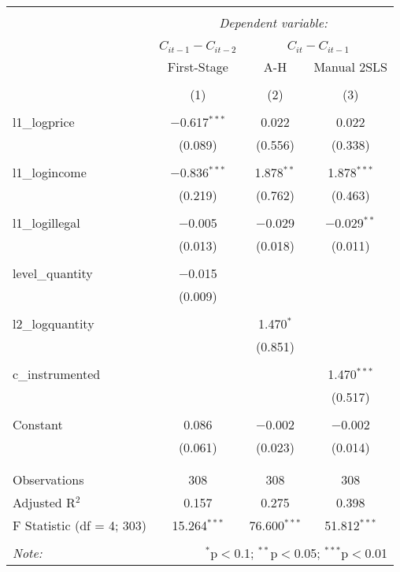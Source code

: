 \documentclass[
]{article}
\begin{document}
\begin{table}[!htbp] \centering 
  \caption{} 
  \label{tab:reg} 
\begin{tabular}{@{\extracolsep{-5pt}}lccc} 
\\[-1.8ex]\hline 
\hline \\[-1.8ex] 
 & \multicolumn{3}{c}{\textit{Dependent variable:}} \\ 
\cline{2-4} 
\\[-1.8ex] & $C_{it-1} - C_{it-2}$ & \multicolumn{2}{c}{$C_{it} - C_{it-1}$} \\ 
 & First-Stage & A-H & Manual 2SLS \\ 
\\[-1.8ex] & (1) & (2) & (3)\\ 
\hline \\[-1.8ex] 
 l1\_logprice & $-$0.617$^{***}$ & 0.022 & 0.022 \\ 
  & (0.089) & (0.556) & (0.338) \\ 
  & & & \\ 
 l1\_logincome & $-$0.836$^{***}$ & 1.878$^{**}$ & 1.878$^{***}$ \\ 
  & (0.219) & (0.762) & (0.463) \\ 
  & & & \\ 
 l1\_logillegal & $-$0.005 & $-$0.029 & $-$0.029$^{**}$ \\ 
  & (0.013) & (0.018) & (0.011) \\ 
  & & & \\ 
 level\_quantity & $-$0.015 &  &  \\ 
  & (0.009) &  &  \\ 
  & & & \\ 
 l2\_logquantity &  & 1.470$^{*}$ &  \\ 
  &  & (0.851) &  \\ 
  & & & \\ 
 c\_instrumented &  &  & 1.470$^{***}$ \\ 
  &  &  & (0.517) \\ 
  & & & \\ 
 Constant & 0.086 & $-$0.002 & $-$0.002 \\ 
  & (0.061) & (0.023) & (0.014) \\ 
  & & & \\ 
\hline \\[-1.8ex] 
Observations & 308 & 308 & 308 \\ 
Adjusted R$^{2}$ & 0.157 & 0.275 & 0.398 \\ 
F Statistic (df = 4; 303) & 15.264$^{***}$ & 76.600$^{***}$ & 51.812$^{***}$ \\ 
\hline 
\hline \\[-1.8ex] 
\textit{Note:}  & \multicolumn{3}{r}{$^{*}$p$<$0.1; $^{**}$p$<$0.05; $^{***}$p$<$0.01} \\ 
\end{tabular} 
\end{table}
\end{document}
